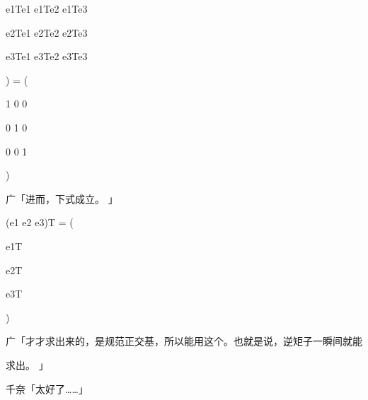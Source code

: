 e1Te1 e1Te2 e1Te3\par
e2Te1 e2Te2 e2Te3\par
e3Te1 e3Te2 e3Te3\par
) = (\par
1 0 0\par
0 1 0\par
0 0 1\par
)\par
广「进而，下式成立。 」\par
(e1 e2 e3)T = (\par
e1T\par
e2T\par
e3T\par
)\par
广「才才求出来的，是规范正交基，所以能用这个。也就是说，逆矩子一瞬间就能\par
求出。 」\par
千奈「太好了……」\par

